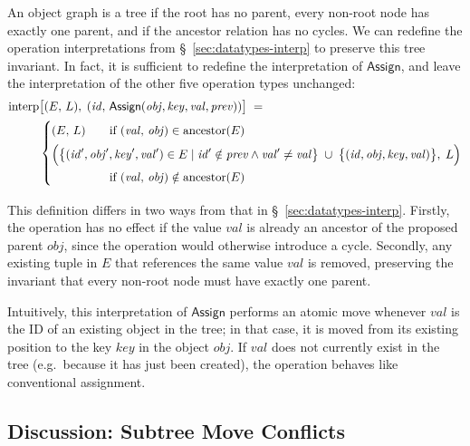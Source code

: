 An object graph is a tree if the root has no parent, every non-root node has exactly one parent, and if the ancestor relation has no cycles.
We can redefine the operation interpretations from \S~\ref{sec:datatypes-interp} to preserve this tree invariant.
In fact, it is sufficient to redefine the interpretation of $\mathsf{Assign}$, and leave the interpretation of the other five operation types unchanged:
\begin{align*}
    \mathrm{interp}&\big[(E,\, L),\; (\mathit{id},\, \mathsf{Assign}(\mathit{obj}, \mathit{key}, \mathit{val}, \mathit{prev})) \big] \;=\\
    & \left\{
    \arraycolsep=0pt \def\arraystretch{1.5}
    \begin{array}{l}
        (E,\, L) \qquad \text{if } (\mathit{val},\, \mathit{obj}) \in \mathrm{ancestor}(E) \\[2pt]
        \Big( \big\{ (\mathit{id}', \mathit{obj}', \mathit{key}', \mathit{val}') \in E \mid
        \mathit{id}' \notin \mathit{prev} \wedge \mathit{val}' \neq \mathit{val} \big\} \;\cup\;
        \big\{ (\mathit{id}, \mathit{obj}, \mathit{key}, \mathit{val}) \big\},\; L \Big) \\
        \hphantom{(E,\, L)} \qquad \text{if } (\mathit{val},\, \mathit{obj}) \notin \mathrm{ancestor}(E)
    \end{array} \right.
\end{align*}

This definition differs in two ways from that in \S~\ref{sec:datatypes-interp}.
Firstly, the operation has no effect if the value $\mathit{val}$ is already an ancestor of the proposed parent $\mathit{obj}$, since the operation would otherwise introduce a cycle.
Secondly, any existing tuple in $E$ that references the same value $\mathit{val}$ is removed, preserving the invariant that every non-root node must have exactly one parent.

Intuitively, this interpretation of $\mathsf{Assign}$ performs an atomic move whenever $\mathit{val}$ is the ID of an existing object in the tree; in that case, it is moved from its existing position to the key $\mathit{key}$ in the object $\mathit{obj}$.
If $\mathit{val}$ does not currently exist in the tree (e.g.\ because it has just been created), the operation behaves like conventional assignment.

\subsection{Discussion: Subtree Move Conflicts}

